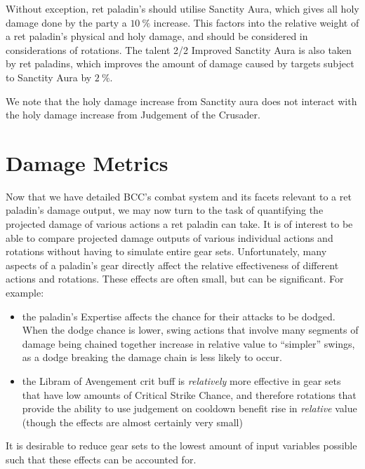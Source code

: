 \documentclass[letterpaper,11pt]{article}
\begin{document}
	Without exception, ret paladin's should utilise Sanctity Aura, which gives all holy damage done by the party a $10~\%$ increase.
	This factors into the relative weight of a ret paladin's physical and holy damage, and should be considered in considerations of rotations.
	The talent 2/2 Improved Sanctity Aura is also taken by ret paladins, which improves the amount of damage caused by targets subject to Sanctity Aura by $2~\%$.
	
	We note that the holy damage increase from Sanctity aura does not interact with the holy damage increase from Judgement of the Crusader.
	
	\section{Damage Metrics}
	Now that we have detailed BCC's combat system and its facets relevant to a ret paladin's damage output, we may now turn to the task of quantifying the projected damage of various actions a ret paladin can take.
	It is of interest to be able to compare projected damage outputs of various individual actions and rotations without having to simulate entire gear sets.
	Unfortunately, many aspects of a paladin's gear directly affect the relative effectiveness of different actions and rotations.
	These effects are often small, but can be significant.
	For example:
	\begin{itemize}
		\item the paladin's Expertise affects the chance for their attacks to be dodged. When the dodge chance is lower, swing actions that involve many segments of damage being chained together increase in relative value to ``simpler'' swings, as a dodge breaking the damage chain is less likely to occur.
		\item the Libram of Avengement crit buff is \emph{relatively} more effective in gear sets that have low amounts of Critical Strike Chance, and therefore rotations that provide the ability to use judgement on cooldown benefit rise in \emph{relative} value (though the effects are almost certainly very small)
	\end{itemize}
	It is desirable to reduce gear sets to the lowest amount of input variables possible such that these effects can be accounted for.
	
\end{document}
